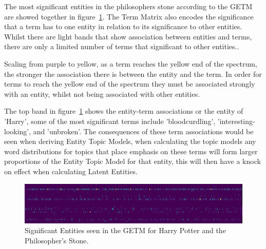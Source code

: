 \documentclass[10pt]{report}
\begin{document}
The most significant entities in the philosophers stone according to the GETM are showed together in figure~\ref{fig:hp_full_ps_sig_getm}. The Term Matrix also encodes the significance that a term has to one entity in relation to its significance to other entities. Whilst there are light bands that show association between entities and terms, there are only a limited number of terms that significant to other entities..

Scaling from purple to yellow, as a term reaches the yellow end of the spectrum, the stronger the association there is between the entity and the term. In order for terms to reach the yellow end of the spectrum they must be associated strongly with an entity, whilst not being associated with other entities.

The top band in figure~\ref{fig:hp_full_ps_sig_getm} shows the entity-term associations or the entity of 'Harry', some of the most significant terms include 'bloodcurdling', 'interesting-looking', and 'unbroken'.  The consequences of these term associations would be seen when deriving Entity Topic Models, when calculating the topic models any word distributions for topics that place emphasis on these terms will form larger proportions of the Entity Topic Model for that entity, this will then have a knock on effect when calculating Latent Entities. 

\begin{figure}[h!]
  \centering
  \includegraphics[scale=0.9]{phil_stone_significant_getm}
  \caption{Significant Entities seen in the GETM for Harry Potter and the Philosopher's Stone.\label{fig:hp_full_ps_sig_getm}} 
\end{figure}

\clearpage
\renewcommand{\baselinestretch}{1.0}\normalsize
\renewcommand{\arraystretch}{1.0}
\end{document}
